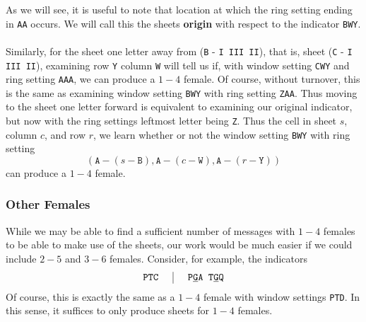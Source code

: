 \noindent As we will see, it is useful to note that location at which the ring setting ending in \texttt{AA} occurs. We will call this the sheets {\bf{origin}} with respect to the indicator \texttt{BWY}.
\\\\Similarly, for the sheet one letter away from (\texttt{B} - \texttt{I III II}), that is, sheet (\texttt{C} - \texttt{I III II}), examining row \texttt{Y} column \texttt{W} will tell us if, with window setting \texttt{CWY} and ring setting \texttt{AAA}, we can produce a $1-4$ female. Of course, without turnover, this is the same as examining window setting \texttt{BWY} with ring setting \texttt{ZAA}. Thus moving to the sheet one letter forward is equivalent to examining our original indicator, but now with the ring settings leftmost letter being \texttt{Z}. Thus the cell in sheet $s$, column $c$, and row $r$, we learn whether or not the window setting \texttt{BWY} with ring setting
\[
	(\texttt{A} - (s - \texttt{B}), \texttt{A} - (c -\texttt{W}), \texttt{A} - (r -\texttt{Y}))
\]
can produce a $1-4$ female.

\subsubsection{Other Females} While we may be able to find a sufficient number of messages with $1-4$ females to be able to make use of the sheets, our work would be much easier if we could include $2-5$ and $3-6$ females. Consider, for example, the indicators
\[
	\setlength{\arraycolsep}{15pt}
	\begin{array}{c | c}
		\texttt{PTC} & \texttt{P}{\uline{\texttt{G}}}\texttt{A T}{\uline{\texttt{G}}}\texttt{Q}
	\end{array}
\]
Of course, this is exactly the same as a $1-4$ female with window settings \texttt{PTD}. In this sense, it suffices to only produce sheets for $1-4$ females.
